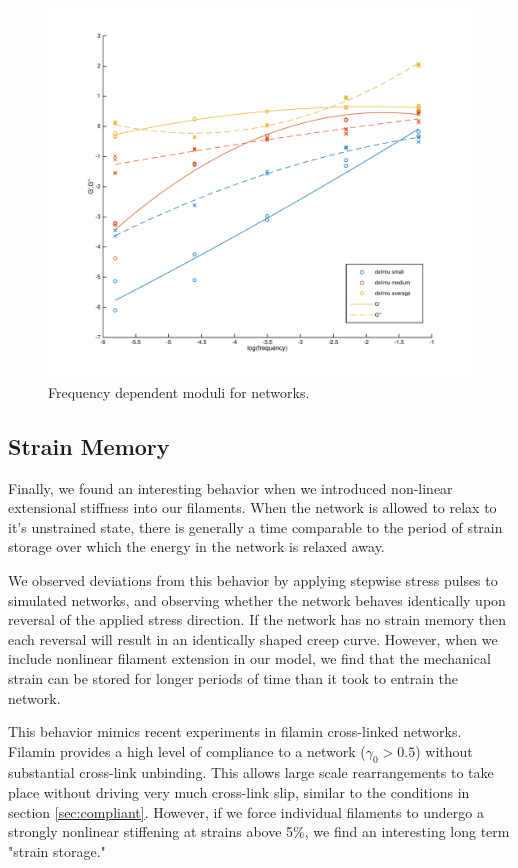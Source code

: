 \begin{figure}[h!]
\centering
\includegraphics[width=\hsize]{slippage/frequency_dep}
\caption{\label{fig:freq} Frequency dependent moduli for networks.}
\end{figure}



\subsection{Strain Memory}
Finally, we found an interesting behavior when we introduced non-linear extensional stiffness into our filaments.  When the network is allowed to relax to it's unstrained state, there is generally a time comparable to the period of strain storage over which the energy in the network is relaxed away.  

We observed deviations from this behavior by applying stepwise stress pulses to simulated networks, and observing whether the network behaves identically upon reversal of the applied stress direction.  If the network has no strain memory then each reversal will result in an identically shaped creep curve.  However, when we include nonlinear filament extension in our model, we find that the mechanical strain can be stored for longer periods of time than it took to entrain the network.

This behavior mimics recent experiments in filamin cross-linked networks.  Filamin provides a high level of compliance to a network ($\gamma_0>0.5$) without substantial cross-link unbinding.  This allows large scale rearrangements to take place without driving very much cross-link slip, similar to the conditions in section \ref{sec:compliant}.  However, if we force individual filaments to undergo a strongly nonlinear stiffening at strains above 5\%, we find an interesting long term "strain storage."

